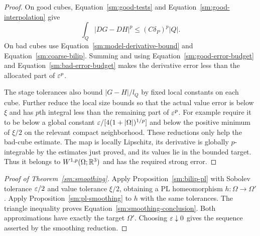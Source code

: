 \begin{proof}
On good cubes, Equation~\eqref{sm:good-tests} and
Equation~\eqref{sm:good-interpolation} give
\[
 \int_Q|DG-DH|^p\le(C\delta_P)^p|Q|.
\]
On bad cubes use
Equation~\eqref{sm:model-derivative-bound} and
Equation~\eqref{sm:coarse-bilip}.  Summing and
using Equation~\eqref{sm:good-error-budget} and
Equation~\eqref{sm:bad-error-budget} makes the
derivative error less than the allocated
part of $\varepsilon^p$.

The stage tolerances also bound
$|G-H|/l_Q$ by fixed local constants
on each cube.  Further reduce the
local size bounds so that the actual
value error is below $\xi$ and has
$p$th integral less than the remaining
part of $\varepsilon^p$.  For example require
it to be below a global constant
$\varepsilon/[4(1+|\Omega|)^{1/p}]$ and below
the positive minimum of $\xi/2$ on
the relevant compact neighborhood.
These reductions only help the bad-cube
estimate.  The map is locally Lipschitz,
its derivative is globally $p$-integrable
by the estimates just proved, and its
values lie in the bounded target.
Thus it belongs to $W^{1,p}(\Omega;\mathbb R^3)$
and has the required strong error.
\end{proof}

\begin{proof}[Proof of Theorem~\ref{sm:smoothing}]
Apply Proposition~\ref{sm:bilip-pl} with
Sobolev tolerance $\varepsilon/2$ and value
tolerance $\xi/2$, obtaining a PL
homeomorphism $h:\Omega\to\Omega'$.
Apply Proposition~\ref{sm:pl-smoothing}
to $h$ with the same tolerances.
The triangle inequality proves
Equation~\eqref{sm:smoothing-conclusion}.
Both approximations have exactly the
target $\Omega'$.  Choosing
$\varepsilon\downarrow0$ gives the sequence
asserted by the smoothing reduction.
\end{proof}
